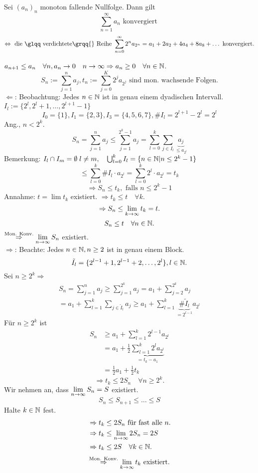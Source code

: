 \documentclass[../ana1.tex]{subfiles}
\begin{document}
\begin{satz}
	Sei \((a_n)_n\) monoton fallende Nullfolge. Dann gilt
	\[\sum_{n=1}^{\infty} a_n \text{ konvergiert }\]
	\[\Leftrightarrow \text{ die \glqq verdichtete\grqq{} Reihe } \sum_{n=0}^{\infty}2^n a_{2^n} = a_1 + 2a_2 + 4a_4 + 8 a_8 + \dots \text{ konvergiert}.\]
\end{satz}
\begin{bew}
	\( a_{n+1} \leq a_n \quad\forall n, a_n\rightarrow0 \quad n \rightarrow\infty \Rightarrow a_n \geq 0 \quad\forall n\in\mathbb{N} \).
	\[ S_n := \sum_{j=1}^{n}a_j, t_n := \sum_{j=0}^{K}2^j a_{2^j} \text{ sind mon. wachsende Folgen.} \]
	\glqq\(\Leftarrow\)\grqq{}: Beobachtung: Jedes \(n\in\mathbb{N}\) ist in genau einem \glqq dyadischen\grqq{} Intervall. \( I_l := \{ 2^l, 2^l + 1, \dots, 2^{l+1} - 1 \} \)
	\[ I_0 = \{1\}, I_1 = \{2,3\}, I_3 = \{4,5,6,7\}, \#I_l = 2^{l+1} - 2^l = 2^l \]
	Ang., \(n<2^k\). 
	\[ S_n = \sum_{j=1}^{n}a_j \leq \sum_{j=1}^{2^k - 1}a_j = \sum_{l=0}^{k}\sum_{j\in I_l} \underbrace{a_j}_{\leq a_{2^l}} \]
	Bemerkung: \(I_l \cap I_m = \emptyset \; l \neq m, \quad \bigcup_{l=0}^{k} I_l = \{n \in \mathbb{N} | n \leq 2^k -1\}\)
	\[\leq \sum_{l=0}^{k} \#I_l \cdot a_{2^l} = \sum_{l=0}^{k} 2^l \cdot a_{2^l} = t_k\]
	\[ \Rightarrow S_n \leq t_k, \text{ falls } n\leq 2^k - 1 \]
	Annahme: \( t = \lim t_k \) existiert. \( \Rightarrow t_k \leq t \quad\forall k \).
	\[ \Rightarrow S_n \leq \lim\limits_{k\rightarrow\infty}t_k = t. \]
	\[S_n \leq t \quad\forall n\in\mathbb{N}.\]
	\( \overset{\text{Mon. Konv.}}{\Rightarrow} \lim\limits_{n\rightarrow\infty} S_n \) existiert. \checkmark\\
	\glqq\( \Rightarrow \)\grqq{}: Beachte: Jedes \(n \in\mathbb{N}, n\geq 2 \) ist in genau einem Block.
	\[ \tilde{I}_l = \{ 2^{l-1} + 1, 2^{l-1} + 2, \dots, 2^l \}, l\in\mathbb{N}. \]
	Sei \(n \geq 2^k \Rightarrow\)
	\begin{align*}
		S_n = \sum_{j=1}^{n}a_j \geq \sum_{j=1}^{2^k}a_j = a_1 + \sum_{j=2}^{2^k} a_j\\
		= a_1 + \sum_{l=1}^{k}\sum_{j\in\tilde{I}_l} a_j \geq a_1 + \sum_{l=1}^{k} \underbrace{\# \tilde{I}_l}_{=2^{l-1}} a_{2^l}
	\end{align*}
	Für \(n \geq 2^k \) ist
	\begin{align*}
		S_n &\geq a_1 + \sum_{l=1}^{k} 2^{l-1}a_{2^l}\\
		&=a_1 + \frac{1}{2} \underbrace{ \sum_{l=1}^{k}2^l a_{2^l} }_{=t_k - a_1}\\
		&= \frac{1}{2}a_1 + \frac{1}{2}t_k
	\end{align*}
	\[ \Rightarrow t_k \leq 2S_n \quad\forall n\geq 2^k. \]
	Wir nehmen an, dass \( \lim\limits_{n\rightarrow\infty}S_n = S \) existiert.
	\[ S_n \leq S_{n+1} \leq \dots \leq S \]
	Halte \( k\in\mathbb{N} \) fest.
	\begin{align*}
		&\Rightarrow t_k \leq 2S_n \text{ für fast alle } n.\\
		&\Rightarrow t_k \leq \lim\limits_{n\rightarrow\infty} 2S_n = 2S\\
		&\Rightarrow t_k \leq 2S \quad\forall k\in\mathbb{N}.
	\end{align*}
	\[ \overset{\text{Mon. Konv.}}{\Rightarrow}\lim\limits_{k\rightarrow\infty}t_k \text{ existiert.} \]
\end{bew}
\end{document}
